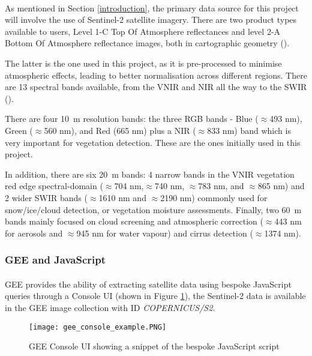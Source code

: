 \paragraph{}
As mentioned in Section \ref{introduction}, the primary data source for this project will involve the use of Sentinel-2 satellite imagery. There are two product types available to users, Level 1-C Top Of Atmosphere reflectances and level 2-A Bottom Of Atmosphere reflectance images, both in cartographic geometry (\cite{sentinel2}). 

The latter is the one used in this project, as it is pre-processed to minimise atmospheric effects, leading to better normalisation across different regions.
There are 13 spectral bands available, from the \gls{VNIR} and \gls{NIR} all the way to the \gls{SWIR} (\cite{sentinel2}).

There are four \SI{10}{\metre} resolution bands: the three \gls{RGB} bands - Blue ($\approx$493 nm), Green ($\approx$560 nm), and Red (665 nm) plus a \gls{NIR} ($\approx$833 nm) band which is very important for vegetation detection. These are the ones initially used in this project.

In addition, there are six \SI{20}{\metre} bands: 4 narrow bands in the \gls{VNIR} vegetation red edge spectral-domain ($\approx$704 nm,$\approx$740 nm, $\approx$783 nm, and $\approx$865 nm) and 2 wider \gls{SWIR} bands ($\approx$1610 nm and $\approx$2190 nm) commonly used for snow/ice/cloud detection, or vegetation moisture assessments. Finally, two \SI{60}{\metre} bands mainly focused on cloud screening and atmospheric correction ($\approx$443 nm for aerosols and $\approx$945 nm for water vapour) and cirrus detection ($\approx$1374 nm).
\subsubsection{\gls{GEE} and JavaScript}
\paragraph{}
\gls{GEE} provides the ability of extracting satellite data using bespoke JavaScript queries through a Console \gls{UI} (shown in Figure \ref{gee_console_ui}), the Sentinel-2 data is available in the \gls{GEE} image collection with ID \textit{COPERNICUS/S2}.

    \begin{figure}[hbt!]
        \centering
        \texttt{[image: gee\_console\_example.PNG]}
        \caption{\gls{GEE} Console \gls{UI} showing a snippet of the bespoke JavaScript script}
        \label{gee_console_ui}
    \end{figure}

